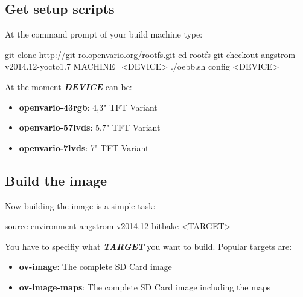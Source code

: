 \subsection{Get setup scripts}

At the command prompt of your build machine type:

\begin{verbatim*}
git clone http://git-ro.openvario.org/rootfs.git
cd rootfs
git checkout angstrom-v2014.12-yocto1.7
MACHINE=<DEVICE> ./oebb.sh config <DEVICE>
\end{verbatim*}

At the moment \textbf{\textit{DEVICE}} can be:

\begin{itemize}
	\item \textbf{openvario-43rgb}: 4,3" TFT Variant
	\item \textbf{openvario-57lvds}: 5,7" TFT Variant
	\item \textbf{openvario-7lvds}: 7" TFT Variant
\end{itemize}

\subsection{Build the image}
Now building the image is a simple task:

\begin{verbatim*}
source environment-angstrom-v2014.12
bitbake <TARGET>
\end{verbatim*}

You have to specifiy what \textbf{\textit{TARGET}} you want to build. Popular targets are:
\begin{itemize}
	\item \textbf{ov-image}: The complete SD Card image
	\item \textbf{ov-image-maps}: The complete SD Card image including the maps
\end{itemize}

